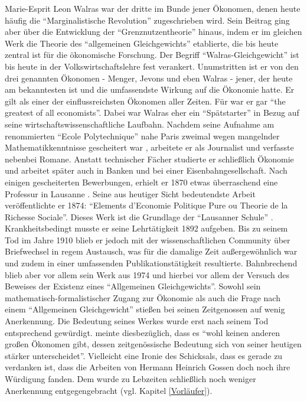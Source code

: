 Marie-Esprit Leon Walras war der dritte im Bunde jener Ökonomen, denen heute häufig die "`Marginalistische Revolution"' zugeschrieben wird. Sein Beitrag ging aber über die Entwicklung der "`Grenznutzentheorie"' hinaus, indem er im gleichen Werk die Theorie des "`allgemeinen Gleichgewichts"' etablierte, die bis heute zentral ist für die ökonomische Forschung. Der Begriff "`Walras-Gleichgewicht"' ist bis heute in der Volkswirtschaftslehre fest verankert. Unumstritten ist er von den drei genannten Ökonomen - Menger, Jevons und eben Walras - jener, der heute am bekanntesten ist und die umfassendste Wirkung auf die Ökonomie hatte. Er gilt als einer der einflussreichsten Ökonomen aller Zeiten. Für \textcite[S. 826]{Schumpeter1954} war er gar "`the greatest of all economists"'. Dabei war Walras eher ein "`Spätstarter"' in Bezug auf seine wirtschaftswissenschaftliche Laufbahn. Nachdem seine Aufnahme am renommierten "`Ecole Polytechnique"' nahe Paris zweimal wegen mangelnder Mathematikkenntnisse gescheitert war \parencite[S. 60]{Felderer1989}, arbeitete er als Journalist und verfasste nebenbei Romane. Anstatt technischer Fächer studierte er schließlich Ökonomie und arbeitet später auch in Banken und bei einer Eisenbahngesellschaft. Nach einigen gescheiterten Bewerbungen, erhielt er 1870 etwas überraschend \parencite[S. 63]{Streissler1990} eine Professur in Lausanne \parencite[S. 326]{Rosner2012}. Seine aus heutiger Sicht bedeutendste Arbeit veröffentlichte er 1874: "`Elements d'Economie Politique Pure ou Theorie de la Richesse Sociale"'. Dieses Werk ist die Grundlage der "`Lausanner Schule"' \parencite[S. 326]{Rosner2012}. Krankheitsbedingt musste er seine Lehrtätigkeit 1892 aufgeben. Bis zu seinem Tod im Jahre 1910 blieb er jedoch mit der wissenschaftlichen Community über Briefwechsel in regem Austausch, was für die damalige Zeit außergewöhnlich war und zudem in einer umfassenden Publikationstätigkeit resultierte. Bahnbrechend blieb aber vor allem sein Werk aus 1974 und hierbei vor allem der Versuch des Beweises der Existenz eines "`Allgemeinen Gleichgewichts"'. Sowohl sein mathematisch-formalistischer Zugang zur Ökonomie als auch die Frage nach einem "`Allgemeinen Gleichgewicht"' stießen bei seinen Zeitgenossen auf wenig Anerkennung. Die Bedeutung seines Werkes wurde erst nach seinem Tod entsprechend gewürdigt. \textcite[S. 75]{Felderer1989} meinte diesbezüglich, dass es "`wohl keinen anderen großen Ökonomen gibt, dessen zeitgenössische Bedeutung sich von seiner heutigen stärker unterscheidet"'. Vielleicht eine Ironie des Schicksals, dass es gerade \textcite{Walras1885} zu verdanken ist, dass die Arbeiten von Hermann Heinrich Gossen doch noch ihre Würdigung fanden. Dem wurde zu Lebzeiten schließlich noch weniger Anerkennung entgegengebracht (vgl. Kapitel \ref{Vorläufer}).  

